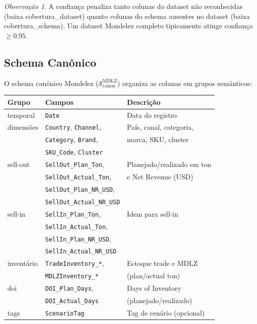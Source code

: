 \documentclass[a4paper, 12pt]{report}
\theoremstyle{definition}
\theoremstyle{remark}
\newtheorem{observacao}{Observa\c{c}\~ao}[chapter]
\begin{document}
\begin{observacao}
  A confian\c{c}a penaliza tanto colunas do dataset n\~ao reconhecidas
  (baixa cobertura\_dataset) quanto colunas do schema ausentes no dataset
  (baixa cobertura\_schema). Um dataset Mondelez completo tipicamente
  atinge confian\c{c}a $\geq 0.95$.
\end{observacao}


\subsection{Schema Can\^onico}

O schema can\^onico Mondelez ($\mathcal{S}_{\text{canon}}^{\text{MDLZ}}$)
organiza as colunas em grupos sem\^anticos:

\begin{center}
\begin{tabular}{llp{5.5cm}}
  \toprule
  \textbf{Grupo} & \textbf{Campos} & \textbf{Descri\c{c}\~ao} \\
  \midrule
  temporal & \texttt{Date} & Data do registro \\
  dimens\~oes & \texttt{Country}, \texttt{Channel}, & Pa\'is, canal, categoria, \\
               & \texttt{Category}, \texttt{Brand}, & marca, SKU, cluster \\
               & \texttt{SKU\_Code}, \texttt{Cluster} & \\
  sell-out & \texttt{SellOut\_Plan\_Ton}, & Planejado/realizado em ton \\
           & \texttt{SellOut\_Actual\_Ton}, & e Net Revenue (USD) \\
           & \texttt{SellOut\_Plan\_NR\_USD}, & \\
           & \texttt{SellOut\_Actual\_NR\_USD} & \\
  sell-in & \texttt{SellIn\_Plan\_Ton}, & Idem para sell-in \\
          & \texttt{SellIn\_Actual\_Ton}, & \\
          & \texttt{SellIn\_Plan\_NR\_USD}, & \\
          & \texttt{SellIn\_Actual\_NR\_USD} & \\
  invent\'ario & \texttt{TradeInventory\_*}, & Estoque trade e MDLZ \\
               & \texttt{MDLZInventory\_*} & (plan/actual ton) \\
  doi & \texttt{DOI\_Plan\_Days}, & Days of Inventory \\
      & \texttt{DOI\_Actual\_Days} & (planejado/realizado) \\
  tags & \texttt{ScenarioTag} & Tag de cen\'ario (opcional) \\
  \bottomrule
\end{tabular}
\end{center}
\end{document}
